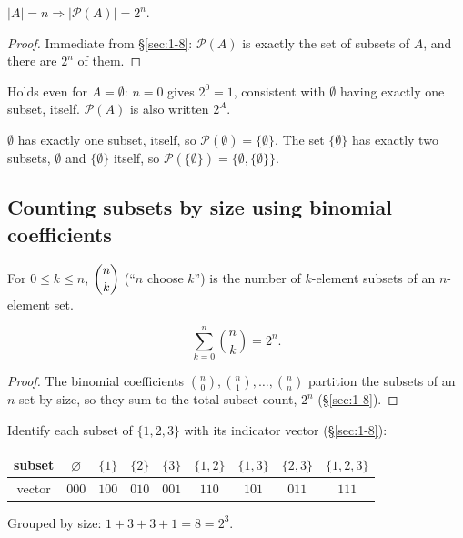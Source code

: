 \begin{corollary}
$|A| = n \Rightarrow |\mathcal{P}(A)| = 2^n$.
\end{corollary}
\begin{proof}
Immediate from \S\ref{sec:1-8}: $\mathcal{P}(A)$ is exactly the set of subsets of $A$, and there are $2^n$ of them.
\end{proof}

\begin{note}
Holds even for $A = \emptyset$: $n=0$ gives $2^0 = 1$, consistent with $\emptyset$ having exactly one subset, itself. $\mathcal{P}(A)$ is also written $2^A$.
\end{note}

\begin{example}
$\emptyset$ has exactly one subset, itself, so $\mathcal{P}(\emptyset) = \{\emptyset\}$. The set $\{\emptyset\}$ has exactly two subsets, $\emptyset$ and $\{\emptyset\}$ itself, so $\mathcal{P}(\{\emptyset\}) = \{\emptyset, \{\emptyset\}\}$.
\end{example}

\subsection{Counting subsets by size using binomial coefficients}
\label{sec:1-10}
\begin{definition}
For $0 \le k \le n$, $\dbinom{n}{k}$ (``$n$ choose $k$'') is the number of $k$-element subsets of an $n$-element set.
\end{definition}

\begin{proposition}
\[
\sum_{k=0}^{n} \binom{n}{k} = 2^n.
\]
\end{proposition}
\begin{proof}
The binomial coefficients $\binom{n}{0}, \binom{n}{1}, \dots, \binom{n}{n}$ partition the subsets of an $n$-set by size, so they sum to the total subset count, $2^n$ (\S\ref{sec:1-8}).
\end{proof}

\begin{example}[$n=3$]
Identify each subset of $\{1,2,3\}$ with its indicator vector (\S\ref{sec:1-8}):
\begin{center}
\begin{tabular}{c|cccccccc}
subset & $\varnothing$ & $\{1\}$ & $\{2\}$ & $\{3\}$ & $\{1,2\}$ & $\{1,3\}$ & $\{2,3\}$ & $\{1,2,3\}$ \\ \hline
vector & $000$ & $100$ & $010$ & $001$ & $110$ & $101$ & $011$ & $111$
\end{tabular}
\end{center}
Grouped by size: $1+3+3+1=8=2^3$.
\end{example}

